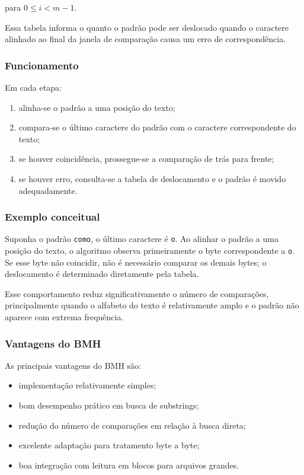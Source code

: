 \documentclass[10pt,twocolumn,a4paper]{article}
\begin{document}
para $0 \leq i < m-1$.

Essa tabela informa o quanto o padrão pode ser deslocado quando o caractere alinhado ao final da janela de comparação causa um erro de correspondência.


\subsubsection{Funcionamento}

Em cada etapa:

\begin{enumerate}[leftmargin=*]
    \item alinha-se o padrão a uma posição do texto;
    \item compara-se o último caractere do padrão com o caractere correspondente do texto;
    \item se houver coincidência, prossegue-se a comparação de trás para frente;
    \item se houver erro, consulta-se a tabela de deslocamento e o padrão é movido adequadamente.
\end{enumerate}

\subsubsection{Exemplo conceitual}

Suponha o padrão \texttt{como}, o  último caractere é \texttt{o}. Ao alinhar o padrão a uma posição do texto, o algoritmo observa primeiramente o byte correspondente a \texttt{o}. Se esse byte não coincidir, não é necessário comparar os demais bytes; o deslocamento é determinado diretamente pela tabela.

Esse comportamento reduz significativamente o número de comparações, principalmente quando o alfabeto do texto é relativamente amplo e o padrão não aparece com extrema frequência.

\subsubsection{Vantagens do BMH}

As principais vantagens do BMH são:

\begin{itemize}[leftmargin=*]
    \item implementação relativamente simples;
    \item bom desempenho prático em busca de substrings;
    \item redução do número de comparações em relação à busca direta;
    \item excelente adaptação para tratamento byte a byte;
    \item boa integração com leitura em blocos para arquivos grandes.
\end{itemize}
\end{document}

